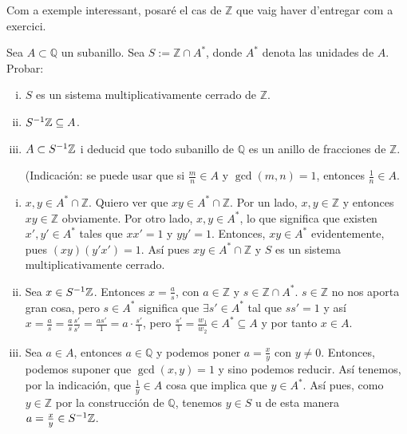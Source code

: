\documentclass[../../../main.tex]{subfiles}
\begin{document}
Com a exemple interessant, posaré el cas de $\mathbb{Z}$ que vaig haver d'entregar com a exercici.

\setcounter{exercici}{68}
\begin{exercici}
Sea $A\subset\mathbb{Q}$ un subanillo. Sea $S:=\mathbb{Z}\cap A^*$, donde $A^*$ denota las unidades de $A$. Probar:
\begin{enumerate}[(i)]
    \item $S$ es un sistema multiplicativamente cerrado de $\mathbb{Z}$.
    \item $S^{-1}\mathbb{Z}\subseteq A$.
    \item $A\subset S^{-1} \mathbb{Z}$ i deducid que todo subanillo de $\mathbb{Q}$ es un anillo de fracciones de $\mathbb{Z}$.
    
    (Indicación: se puede usar que si $\frac{m}{n}\in A$ y $\gcd(m,n) = 1$, entonces $\frac{1}{n}\in A$.
\end{enumerate}
\end{exercici}
\begin{sol}
\begin{enumerate}[(i)]
    \item $x,y\in A^*\cap \mathbb{Z}$. Quiero ver que $xy\in A^*\cap \mathbb{Z}$. Por un lado, $x,y\in \mathbb{Z}$ y entonces $xy\in\mathbb{Z}$ obviamente. Por otro lado, $x,y\in A^*$, lo que significa que existen $x',y'\in A^*$ tales que $xx' = 1$ y $yy' = 1$. Entonces, $xy\in A^*$ evidentemente, pues $(xy)(y'x') = 1$. Así pues $xy\in A^*\cap \mathbb Z$ y $S$ es un sistema multiplicativamente cerrado.
    \item Sea $x\in S^{-1} \mathbb{Z}$. Entonces $x = \frac{a}{s}$, con $a\in\mathbb{Z}$ y $s\in \mathbb Z\cap A^*$. $s\in \mathbb Z$ no nos aporta gran cosa, pero $s\in A^*$ significa que $\exists s'\in A^*$ tal que $ss' = 1$ y así $x = \frac{a}{s} = \frac{a}{s}\frac{s'}{s'} = \frac{as'}{1} = a\cdotp \frac{s'}{1}$, pero $\frac{s'}{1} = \frac{w_1}{w_2}\in A^*\subseteq A$ y por tanto $x\in A$.
    \item Sea $a\in A$, entonces $a\in\mathbb Q$ y podemos poner $a = \frac{x}{y}$ con $y\not=0$. Entonces, podemos suponer que $\gcd(x,y) = 1$ y sino podemos reducir. Así tenemos, por la indicación, que $\frac{1}{y}\in A$ cosa que implica que $y\in A^*$. Así pues, como $y\in\mathbb Z$ por la construcción de $\mathbb Q$, tenemos $y\in S$ u de esta manera $a = \frac{x}{y}\in S^{-1} \mathbb Z$.
\end{enumerate}
\end{sol}
\end{document}
